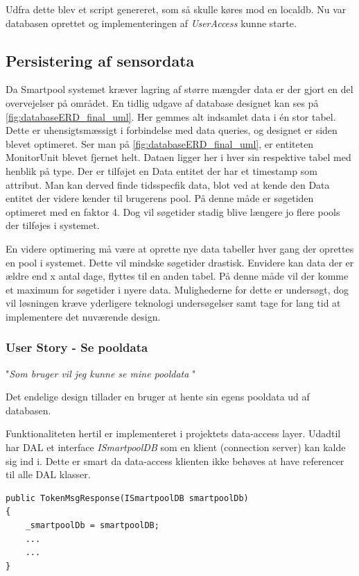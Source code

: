 Udfra dette blev et script genereret, som så skulle køres mod en localdb. Nu var databasen oprettet og implementeringen af \textit{UserAccess} kunne starte.

\subsection{Persistering af sensordata}
Da Smartpool systemet kræver lagring af større mængder data er der gjort en del overvejelser på området. En tidlig udgave af database designet kan ses på \ref{fig:databaseERD_final_uml}. Her gemmes alt indsamlet data i én stor tabel. Dette er uhensigtsmæssigt i forbindelse med data queries, og designet er siden blevet optimeret. Ser man på \ref{fig:databaseERD_final_uml}, er entiteten MonitorUnit blevet fjernet helt. Dataen ligger her i hver sin respektive tabel med henblik på type. Der er tilføjet en Data entitet der har et timestamp som attribut. Man kan derved finde tidsspecfik data, blot ved at kende den Data entitet der videre kender til brugerens pool. På denne måde er søgetiden optimeret med en faktor 4. Dog vil søgetider stadig blive længere jo flere pools der tilføjes i systemet.

En videre optimering må være at oprette nye data tabeller hver gang der oprettes en pool i systemet. Dette vil mindske søgetider drastisk. Envidere kan data der er ældre end x antal dage, flyttes til en anden tabel. På denne måde vil der komme et maximum for søgetider i nyere data.
Mulighederne for dette er undersøgt, dog vil løsningen kræve yderligere teknologi undersøgelser samt tage for lang tid at implementere det nuværende design.

\subsubsection{User Story - Se pooldata}

"\textit{Som bruger vil jeg kunne se mine pooldata }"

Det endelige design tillader en bruger at hente sin egens pooldata ud af databasen.

Funktionaliteten hertil er implementeret i projektets data-access layer. Udadtil har DAL et interface \textit{ISmartpoolDB} som en klient (connection server) kan kalde sig ind i. Dette er smart da data-access klienten ikke behøves at have referencer til alle DAL klasser.

\begin{lstlisting}[caption=TokenMsgResponse constructor,label=code:tokenMsgRespone_constructor]
public TokenMsgResponse(ISmartpoolDB smartpoolDb)
{
	_smartpoolDb = smartpoolDB;
	...
	...
}
\end{lstlisting}

